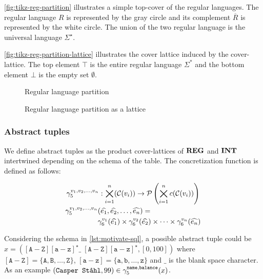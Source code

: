\autoref{fig:tikz-reg-partition} illustrates a simple top-cover of the regular languages.
The regular language $R$ is represented by the gray circle and its complement $\overline{R}$ is represented by the white circle.
The union of the two regular language is the universal language $\Sigma^\star$.

\autoref{fig:tikz-reg-partition-lattice} illustrates the cover lattice induced by the cover-lattice.
The top element $\top$ is the entire regular language $\Sigma^*$ and the bottom element $\bot$ is the empty set $\emptyset$.


\begin{figure}
    \center
    
    \caption{Regular language partition}
    \label{fig:tikz-reg-partition}
\end{figure}

\begin{figure}[!htb]
    \center
    
    \caption{Regular language partition as a lattice}
    \label{fig:tikz-reg-partition-lattice}
\end{figure}

\subsubsection{Abstract tuples}\label{subsubsec:abstract-tuples}

We define abstract tuples as the product cover-lattices of $\mathbf{REG}$ and $\mathbf{INT}$ intertwined depending on the schema of the table.
The concretization function is defined as follows:


\begin{gather}
    \gamma^{v_1, v_2, \dots, v_n}_5 : \bigtimes_{i = 1}^{n}(\mathcal{C}(v_i)) \rightarrow \mathcal{P}\left(\bigtimes_{i = 1}^n c(\mathcal{C}(v_i)) \right)\\
    \begin{split}
        \gamma^{v_1, v_2, \dots, v_n}_5 & (\widehat{e_1}, \widehat{e_2}, \dots, \widehat{e_n}) = \\
         &\gamma^{v_1}_6(\widehat{e_1}) \times \gamma^{v_2}_6(\widehat{e_2}) \times \dots \times \gamma^{v_n}_6(\widehat{e_n})
    \end{split}
\end{gather}

Considering the schema in \autoref{lst:motivate-sql}, a possible abstract tuple could be $x = ([\texttt{A}-\texttt{Z}][\texttt{a}-\texttt{z}]^\star \_ \; [\texttt{A}-\texttt{Z}][\texttt{a}-\texttt{z}]^\star, [0, 100])$ where $[\texttt{A}-\texttt{Z}] = \{\texttt{A}, \texttt{B}, \dots, \texttt{Z}\}$, $[\texttt{a}-\texttt{z}] = \{\texttt{a}, \texttt{b}, \dots, \texttt{z}\}$ and $\_$ is the blank space character.
As an example $(\texttt{Casper Ståhl}, 99) \in \gamma_5^{\texttt{name},\texttt{balance}}(x)$.

